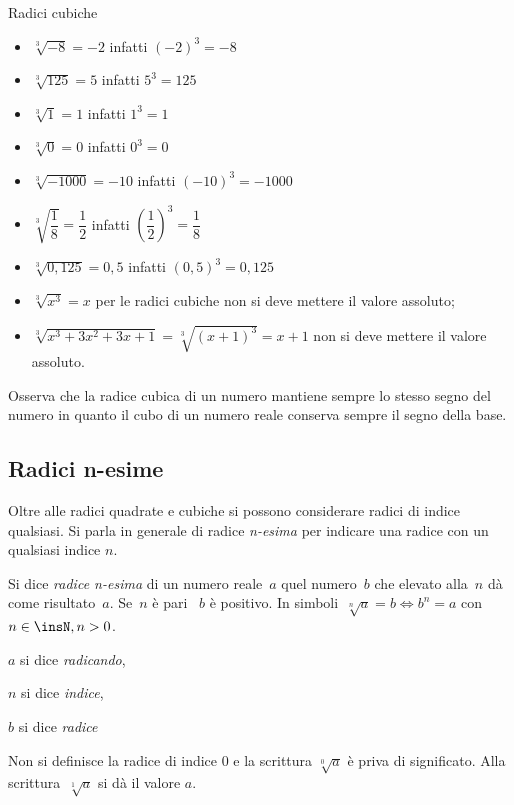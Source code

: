 \begin{esempio}
Radici cubiche
 \begin{multicols}{2}
 \begin{itemize}
\item $\sqrt[3]{-8}=-2$ infatti $\left(-2\right)^3=-8$
\item $\sqrt[3]{125}=5$ infatti $5^3=125$
\item $\sqrt[3]1=1$ infatti $1^3=1$
\item $\sqrt[3]0=0$ infatti $0^3=0$
\item $\sqrt[3]{-1000}=-10$ infatti $\left(-10\right)^3=-1000$
\item $\sqrt[3]{\dfrac 1 8}=\dfrac 1 2$ infatti 
  $\left(\dfrac 1 2\right)^3=\dfrac 1 8$
\item $\sqrt[3]{0,125}=0,5$ infatti $(0,5)^3=0,125$
\item $\sqrt[3]{x^3}=x$ per le radici cubiche non si deve mettere 
  il valore assoluto;
\item $\sqrt[3]{x^3+3x^2+3x+1}=\sqrt[3]{(x+1)^3}=x+1$ non si deve mettere 
  il valore assoluto.
\end{itemize}
\end{multicols}
\end{esempio}

Osserva che la radice cubica di un numero mantiene sempre lo stesso segno del 
numero in quanto il cubo di un numero reale conserva sempre il segno della 
base.

\subsection{Radici n-esime}
Oltre alle radici quadrate e cubiche si possono considerare radici di indice 
qualsiasi. 
Si parla in generale di radice \emph{n-esima} per indicare una radice con un 
qualsiasi indice $n$.

\begin{definizione}
Si dice \emph{radice n-esima} di un numero reale~$a$ quel numero~$b$ che 
elevato alla~$n$ dà come risultato~$a$. Se~$n$ è pari ~$b$ è positivo.
In simboli~$\sqrt[n]a=b \Leftrightarrow b^n=a$ con $n\in \insN, n > 0$.

$a$ si dice \emph{radicando}, 

$n$ si dice \emph{indice}, 

$b$ si dice \emph{radice}

Non si definisce la radice di indice $0$ e la scrittura $\sqrt[0]a$ è priva 
di significato. Alla scrittura~$\sqrt[1]a$ si dà il valore $a$.
\end{definizione}


